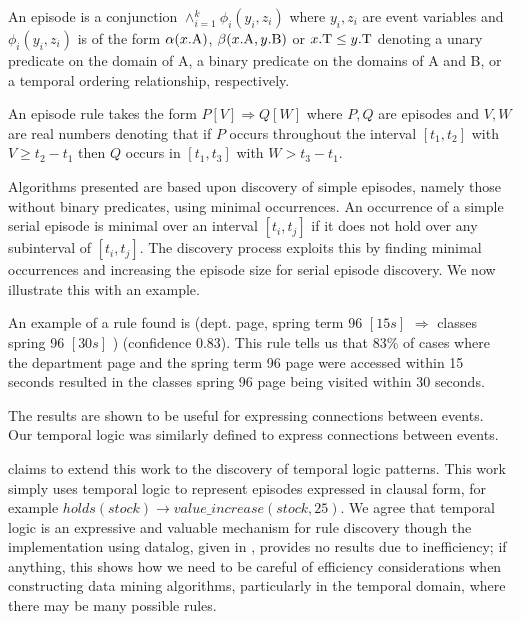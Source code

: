 \begin{definition}[Episode]
\begin{rm}
An episode is a conjunction $\wedge_{i=1}^k \phi_i (y_i,z_i)$ where
$y_i,z_i$ are event variables and $\phi_i (y_i,z_i)$ is of the form
$\alpha(x.{\rm A})$, $\beta(x.{\rm A},y.{\rm B})$ or $x.{\rm T} \le
y.{\rm T}$
denoting a unary 
predicate on the domain of A, a binary predicate on the domains of A
and B, or a temporal ordering relationship, respectively.
\end{rm}
\end{definition}


\begin{definition}
\begin{rm}
An episode rule takes the form $P[V] \Rightarrow Q[W]$ where $P,Q$ are
episodes and $V,W$ are real numbers denoting that if $P$ occurs
throughout the interval $[t_1,t_2]$ with $V \ge t_2 - t_1$ then $Q$
occurs in $[t_1,t_3]$ with $W > t_3 - t_1$.
\end{rm}
\end{definition}

Algorithms presented are based upon discovery of simple episodes,
namely those without binary predicates, using minimal occurrences. An
occurrence of a simple serial episode is minimal over an interval $[t_i,t_j]$
if it does not hold 
over any subinterval of $[t_i,t_j]$. The discovery process exploits this by
finding minimal occurrences and increasing the episode size for serial
episode discovery. We now illustrate this with an example.

\begin{example}
\begin{rm}
An example of a rule found is (dept. page, spring term 96 $[15s]$
$\Rightarrow$ classes spring 96 $[30s]$ ) (confidence 0.83).  This
rule tells us that 83\% of cases where the department page and the
spring term 96 page were accessed within 15 seconds resulted in the
classes spring 96 page being visited within 30 seconds.
\end{rm}
\end{example}

The results are shown to be useful for expressing connections between
events. Our temporal logic was similarly defined to express
connections between events.

\medskip

\cite{pt96} claims to extend this work to the discovery of temporal
logic patterns. This work simply uses temporal logic to represent
episodes expressed in clausal form, for example $holds(stock) \to
value\_increase(stock,25)$. We agree that temporal logic is an
expressive and valuable mechanism for rule discovery though the
implementation using datalog, given in \cite{pt96}, provides no
results due to inefficiency; if anything, this shows how we need to be
careful of 
efficiency considerations when constructing data mining algorithms,
particularly in the temporal domain, where there may be many possible
rules. 

